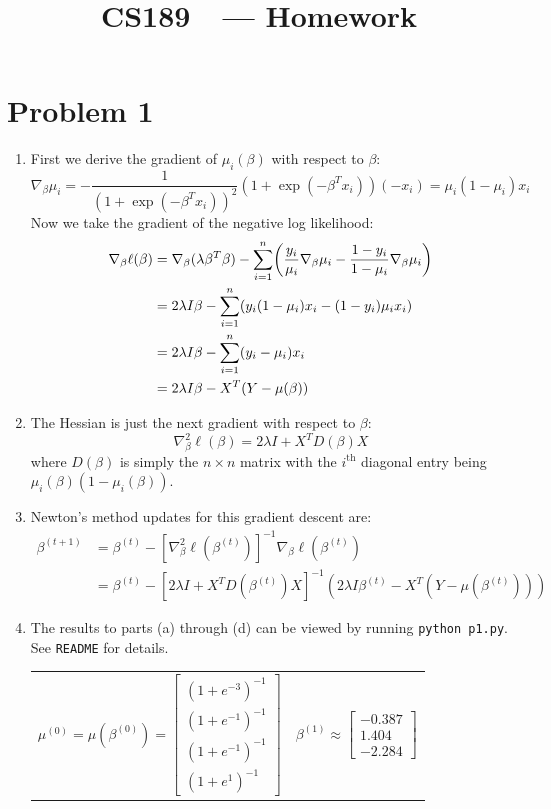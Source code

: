 \documentclass[11pt]{article}
\title{CS189\ \Session\  --- Homework \Homework}
\author{\Name}
\let\origleft\left
\let\origright\right
\renewcommand{\left}{\mathopen{}\mathclose\bgroup\origleft}
\renewcommand{\right}{\aftergroup\egroup\origright}
\begin{document}
\maketitle
{}
\setcounter{problemnumber}{0}

\section*{Problem 1}
\begin{enumerate}[1.]
\item First we derive the gradient of $\mu_i(\beta)$ with respect to $\beta$:
$$\nabla_{\beta}\mu_i = -\frac1{(1+\exp(-\beta^Tx_i))^2}(1+\exp(-\beta^Tx_i))(-x_i) = \mu_i(1-\mu_i)x_i$$
Now we take the gradient of the negative log likelihood:
\begin{align*}
\nabla_{\beta}\ell(\beta) &= \nabla_{\beta}(\lambda\beta^T\beta) - \sum_{i=1}^n\left(\frac{y_i}{\mu_i}\nabla_{\beta}\mu_i - \frac{1-y_i}{1-\mu_i}\nabla_{\beta}\mu_i\right)\\
&= 2\lambda I\beta - \sum_{i=1}^n \left(y_i(1-\mu_i)x_i - (1-y_i)\mu_ix_i\right)\\
&= 2\lambda I\beta - \sum_{i=1}^n (y_i-\mu_i)x_i\\
&= 2\lambda I\beta - X^T(Y-\mu(\beta))
\end{align*}
\item The Hessian is just the next gradient with respect to $\beta$:
$$\nabla_{\beta}^2\ell(\beta) = 2\lambda I + X^TD(\beta)X$$
where $D(\beta)$ is simply the $n\times n$ matrix with the $i^{\text{th}}$ diagonal entry being $\mu_i(\beta)(1-\mu_i(\beta))$.
\item Newton's method updates for this gradient descent are:
\begin{align*}
\beta^{(t+1)} &= \beta^{(t)} - [\nabla_{\beta}^2\ell(\beta^{(t)})]^{-1} \nabla_{\beta}\ell(\beta^{(t)})\\
&= \beta^{(t)} - [2\lambda I + X^TD(\beta^{(t)})X]^{-1} (2\lambda I\beta^{(t)} - X^T(Y-\mu(\beta^{(t)})))
\end{align*}
\item The results to parts (a) through (d) can be viewed by running \texttt{python p1.py}. See \texttt{README} for details.\\
\begin{tabular}{cc}
$\mu^{(0)} = \mu(\beta^{(0)}) = \begin{bmatrix}(1+e^{-3})^{-1}\\(1+e^{-1})^{-1}\\(1+e^{-1})^{-1}\\(1+e^{1})^{-1}\end{bmatrix}$ & $\beta^{(1)} \approx \begin{bmatrix}-0.387\\1.404\\-2.284\end{bmatrix}$\\

\end{tabular}
\end{enumerate}
\end{document}
